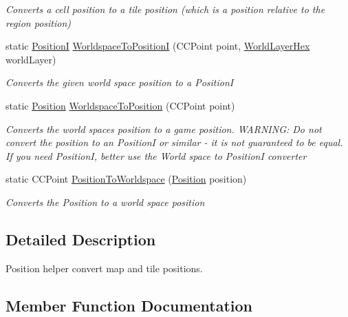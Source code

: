 \begin{DoxyCompactItemize}
\begin{DoxyCompactList}\small\item\em Converts a cell position to a tile position (which is a position relative to the region position) \end{DoxyCompactList}\item 
static \hyperlink{classCore_1_1Models_1_1PositionI}{Position\+I} \hyperlink{classClient_1_1Common_1_1Helper_1_1PositionHelper_a6227f63a447ea7c677565fcde05aa7e1}{Worldspace\+To\+Position\+I} (C\+C\+Point point, \hyperlink{classClient_1_1Common_1_1Views_1_1WorldLayerHex}{World\+Layer\+Hex} world\+Layer)
\begin{DoxyCompactList}\small\item\em Converts the given world space position to a Position\+I \end{DoxyCompactList}\item 
static \hyperlink{classCore_1_1Models_1_1Position}{Position} \hyperlink{classClient_1_1Common_1_1Helper_1_1PositionHelper_a8b3306e465236f54530a7c140d156458}{Worldspace\+To\+Position} (C\+C\+Point point)
\begin{DoxyCompactList}\small\item\em Converts the world spaces position to a game position. W\+A\+R\+N\+I\+N\+G\+: Do not convert the position to an Position\+I or similar -\/ it is not guaranteed to be equal. If you need Position\+I, better use the World space to Position\+I converter \end{DoxyCompactList}\item 
static C\+C\+Point \hyperlink{classClient_1_1Common_1_1Helper_1_1PositionHelper_ab338fba1c421fd0ef2eae917215a588f}{Position\+To\+Worldspace} (\hyperlink{classCore_1_1Models_1_1Position}{Position} position)
\begin{DoxyCompactList}\small\item\em Converts the Position to a world space position \end{DoxyCompactList}\end{DoxyCompactItemize}


\subsection{Detailed Description}
Position helper convert map and tile positions. 



\subsection{Member Function Documentation}
\hypertarget{classClient_1_1Common_1_1Helper_1_1PositionHelper_a44e228caa4d6ea5a002c7b3715c67d19}{}
